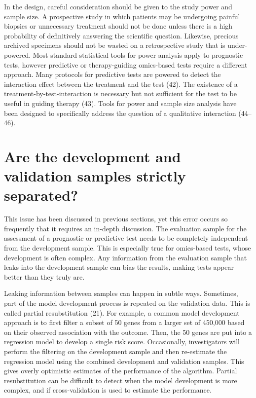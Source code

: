 \documentclass[11pt]{article}
\begin{document}
In the design, careful consideration should be given to the study power
and sample size. A prospective study in which patients may be undergoing
painful biopsies or unnecessary treatment should not be done unless
there is a high probability of definitively answering the scientific
question. Likewise, precious archived specimens should not be wasted on
a retrospective study that is under-powered. Most standard statistical
tools for power analysis apply to prognostic tests, however predictive
or therapy-guiding omics-based tests require a different approach. Many
protocols for predictive tests are powered to detect the interaction
effect between the treatment and the test (42). The existence of a
treatment-by-test-interaction is necessary but not sufficient for the
test to be useful in guiding therapy (43). Tools for power and sample
size analysis have been designed to specifically address the question of
a qualitative interaction (44--46).

\section{Are the development and validation samples strictly
separated?}\label{are-the-development-and-validation-samples-strictly-separated}

This issue has been discussed in previous sections, yet this error
occurs so frequently that it requires an in-depth discussion. The
evaluation sample for the assessment of a prognostic or predictive test
needs to be completely independent from the development sample. This is
especially true for omics-based tests, whose development is often
complex. Any information from the evaluation sample that leaks into the
development sample can bias the results, making tests appear better than
they truly are.

Leaking information between samples can happen in subtle ways.
Sometimes, part of the model development process is repeated on the
validation data. This is called partial resubstitution (21). For
example, a common model development approach is to first filter a subset
of 50 genes from a larger set of 450,000 based on their observed
association with the outcome. Then, the 50 genes are put into a
regression model to develop a single risk score. Occasionally,
investigators will perform the filtering on the development sample and
then re-estimate the regression model using the combined development and
validation samples. This gives overly optimistic estimates of the
performance of the algorithm. Partial resubstitution can be difficult to
detect when the model development is more complex, and if
cross-validation is used to estimate the performance.
\end{document}
